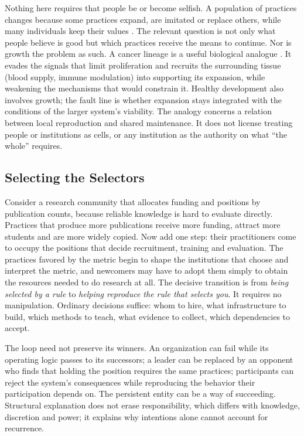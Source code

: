 \documentclass[letterpaper]{article} %
\theoremstyle{definition}
\begin{document}
Nothing here requires that people be or become selfish. A population of practices changes because some practices expand, are imitated or replace others, while many individuals keep their values \citep{smaldino2016}. The relevant question is not only what people believe is good but which practices receive the means to continue. Nor is growth the problem as such. A cancer lineage is a useful biological analogue \citep{aktipis2015,hanahan2011}. It evades the signals that limit proliferation and recruits the surrounding tissue (blood supply, immune modulation) into supporting its expansion, while weakening the mechanisms that would constrain it. Healthy development also involves growth; the fault line is whether expansion stays integrated with the conditions of the larger system's viability. The analogy concerns a relation between local reproduction and shared maintenance. It does not license treating people or institutions as cells, or any institution as the authority on what ``the whole'' requires.

\subsection{Selecting the Selectors}

Consider a research community that allocates funding and positions by publication counts, because reliable knowledge is hard to evaluate directly. Practices that produce more publications receive more funding, attract more students and are more widely copied. Now add one step: their practitioners come to occupy the positions that decide recruitment, training and evaluation. The practices favored by the metric begin to shape the institutions that choose and interpret the metric, and newcomers may have to adopt them simply to obtain the resources needed to do research at all. The decisive transition is from \emph{being selected by a rule} to \emph{helping reproduce the rule that selects you}. It requires no manipulation. Ordinary decisions suffice: whom to hire, what infrastructure to build, which methods to teach, what evidence to collect, which dependencies to accept.

The loop need not preserve its winners. An organization can fail while its operating logic passes to its successors; a leader can be replaced by an opponent who finds that holding the position requires the same practices; participants can reject the system's consequences while reproducing the behavior their participation depends on. The persistent entity can be a way of succeeding. Structural explanation does not erase responsibility, which differs with knowledge, discretion and power; it explains why intentions alone cannot account for recurrence.
\end{document}
